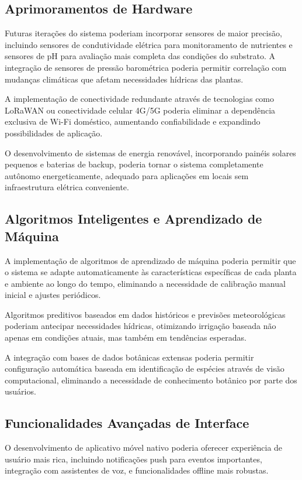 \subsection{Aprimoramentos de Hardware}

Futuras iterações do sistema poderiam incorporar sensores de maior precisão, incluindo sensores de condutividade elétrica para monitoramento de nutrientes e sensores de pH para avaliação mais completa das condições do substrato. A integração de sensores de pressão barométrica poderia permitir correlação com mudanças climáticas que afetam necessidades hídricas das plantas.

A implementação de conectividade redundante através de tecnologias como LoRaWAN ou conectividade celular 4G/5G poderia eliminar a dependência exclusiva de Wi-Fi doméstico, aumentando confiabilidade e expandindo possibilidades de aplicação.

O desenvolvimento de sistemas de energia renovável, incorporando painéis solares pequenos e baterias de backup, poderia tornar o sistema completamente autônomo energeticamente, adequado para aplicações em locais sem infraestrutura elétrica conveniente.

\subsection{Algoritmos Inteligentes e Aprendizado de Máquina}

A implementação de algoritmos de aprendizado de máquina poderia permitir que o sistema se adapte automaticamente às características específicas de cada planta e ambiente ao longo do tempo, eliminando a necessidade de calibração manual inicial e ajustes periódicos.

Algoritmos preditivos baseados em dados históricos e previsões meteorológicas poderiam antecipar necessidades hídricas, otimizando irrigação baseada não apenas em condições atuais, mas também em tendências esperadas.

A integração com bases de dados botânicas extensas poderia permitir configuração automática baseada em identificação de espécies através de visão computacional, eliminando a necessidade de conhecimento botânico por parte dos usuários.

\subsection{Funcionalidades Avançadas de Interface}

O desenvolvimento de aplicativo móvel nativo poderia oferecer experiência de usuário mais rica, incluindo notificações push para eventos importantes, integração com assistentes de voz, e funcionalidades offline mais robustas.

